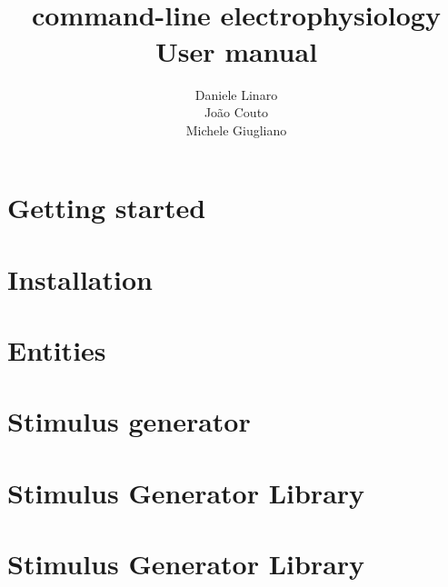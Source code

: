 \documentclass[10pt,a4paper,twoside]{book}
\title{\textbf{\progname} \\ command-line electrophysiology \\ User manual}
\author{Daniele Linaro \\ Jo\~ao Couto \\ Michele Giugliano}
\date{}
\begin{document}
\maketitle
\thispagestyle{empty}

\tableofcontents
\newpage
{}
\chapter{Getting started}
\label{chapter:start}


\chapter{Installation}
\label{chapter:install}



\chapter{Entities}
\label{chapter:entities}

\chapter{Stimulus generator}
\label{chapter:stimgen}



\appendix
\chapter{Stimulus Generator Library}

\chapter{Stimulus Generator Library}






\end{document}
